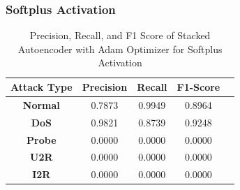 \documentclass[12pt, a4paper]{report}
\begin{document}
\subsubsection{Softplus Activation}
\begin{table}[ht]
\centering
\captionsetup{justification=centering,margin=2cm}
\begin{tabular}{|c|c|c|c|c|}
\hline
\multicolumn{1}{|c|}{\textbf{Attack Type}} & \multicolumn{1}{c|}{\textbf{Precision}} & \multicolumn{1}{c|}{\textbf{Recall}} & \multicolumn{1}{c|}{\textbf{F1-Score}} \\ \hline
\textbf{Normal}        & 0.7873                                   & 0.9949                                & 0.8964                                                                  \\ \hline
\textbf{DoS}           & 0.9821                                  & 0.8739                                &  0.9248                                                                    \\ \hline
\textbf{Probe}         & 0.0000                                  & 0.0000                                & 0.0000                                                                  \\ \hline
\textbf{U2R}           & 0.0000                                    & 0.0000                                & 0.0000                                                                   \\ \hline
\textbf{I2R}           & 0.0000                                      & 0.0000                                   & 0.0000                                                            \\ \hline         \end{tabular}
\caption{Precision, Recall, and F1 Score of Stacked Autoencoder with Adam Optimizer for Softplus Activation}
\label{prf1_adam_softplus_auto}
\end{table}

\clearpage
\end{document}
